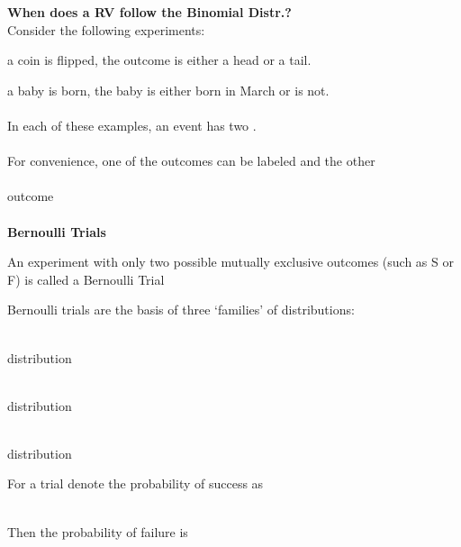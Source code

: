 \large\textbf{When does a RV follow the Binomial Distr.?}\normalsize\\
Consider the following experiments:
\bi
\item a coin is flipped, the outcome is either a head or a tail.
\item a baby is born, the baby is either born in March or is not.\\~\\
\ei
In each of these examples, an event has two \underbar{~~~~~~~~~~~~~~~~~~~~~~~~~~~~~~~~~~~~~~~~~~~~~~~~~~~~~}. \\~\\
For convenience, one of the outcomes can be labeled \underbar{~~~~~~~~~~~~~~~~~~~~~~~~~~~~~~~~~~~~~~~~} and the other \\~\\
outcome \underbar{~~~~~~~~~~~~~~~~~~~~~~~~~~~~~~~~~~~~~~~~~~~~~~~~~}\\~\\
\textbf{Bernoulli Trials}
\bi
\item An experiment with only two possible mutually exclusive outcomes (such as S or F) is called a Bernoulli Trial
\bi 
\item Bernoulli trials are the basis of three `families' of distributions:\\~\\
\bi
\item \underbar{~~~~~~~~~~~~~~~~~~~~~~~~~~~~~~~~~~~~~~~~~~~~~~~~~} distribution\\~\\
\item \underbar{~~~~~~~~~~~~~~~~~~~~~~~~~~~~~~~~~~~~~~~~~~~~~~~~~} distribution\\~\\
\item \underbar{~~~~~~~~~~~~~~~~~~~~~~~~~~~~~~~~~~~~~~~~~~~~~~~~~} distribution\\
\ei
\ei 
\item For a trial denote the probability of success as \\~\\
\item Then the probability of failure is\\~\\~\\
\ei

\pagebreak

